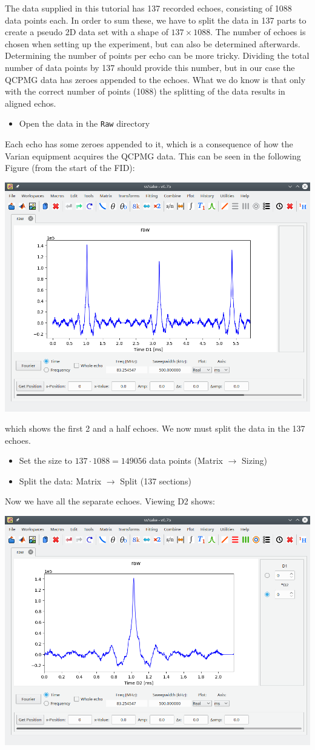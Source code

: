 \documentclass[11pt,a4paper]{article}
\begin{document}
The data supplied in this tutorial has 137 recorded echoes, consisting of 1088 data points each.
In order to sum these, we have to split the data in 137 parts to create a pseudo 2D data set with a shape of $137 \times 1088$.
The number of echoes is chosen when setting up the experiment, but can also be determined afterwards.
Determining the number of points per echo can be more tricky.
Dividing the total number of data points by 137 should provide this number, but in our case the QCPMG data has zeroes appended to the echoes.
What we do know is that only with the correct number of points (1088) the splitting of the data results in aligned echos.

\begin{itemize}
  \item Open the data in the \texttt{Raw} directory
\end{itemize}
Each echo has some zeroes appended to it, which is a consequence of how the Varian equipment acquires the QCPMG data.
This can be seen in the following Figure (from the start of the FID):
\begin{center}
\includegraphics[width=0.7\linewidth]{Figs/Fig1.png}
\end{center}
which shows the first 2 and a half echoes. We now must split the data in the 137 echoes.
\begin{itemize}
  \item Set the size to $137 \cdot 1088 = 149056$ data points (Matrix $\longrightarrow$ Sizing)
  \item Split the data: Matrix $\longrightarrow$ Split (137 sections)
\end{itemize}
Now we have all the separate echoes.
Viewing D2 shows:
\begin{center}
\includegraphics[width=0.7\linewidth]{Figs/Fig2.png}
\end{center}
\end{document}
